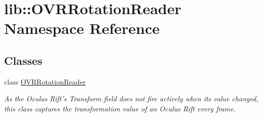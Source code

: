 \hypertarget{namespacelib_1_1OVRRotationReader}{\section{lib\-:\-:\-O\-V\-R\-Rotation\-Reader \-Namespace \-Reference}
\label{namespacelib_1_1OVRRotationReader}
}
\subsection*{\-Classes}
\begin{DoxyCompactItemize}
\item 
class \hyperlink{classlib_1_1OVRRotationReader_1_1OVRRotationReader}{\-O\-V\-R\-Rotation\-Reader}
\begin{DoxyCompactList}\small\item\em \-As the \-Oculus \-Rift's \-Transform field does not fire actively when its value changed, this class captures the transformation value of an \-Oculus \-Rift every frame. \end{DoxyCompactList}\end{DoxyCompactItemize}

